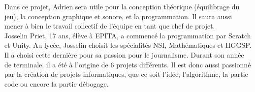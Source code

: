 \documentclass[12pt,a4paper]{article}
\begin{document}
\noindent Dans ce projet, Adrien sera utile pour la conception théorique (équilibrage du jeu), la conception graphique et sonore, et la programmation. Il saura aussi mener à bien le travail collectif de l'équipe en tant que chef de projet.\\

Josselin Priet, 17 ans, élève à EPITA, a commencé la programmation par Scratch et Unity. Au lycée, Josselin choisit les spécialités NSI, Mathématiques et HGGSP. Il a choisi cette dernière pour sa passion pour le journalisme. Durant son année de terminale, il a été à l’origine de 6 projets différents. Il est donc aussi passionné par la création de projets informatiques, que ce soit l’idée, l’algorithme, la partie code ou encore la partie débogage.
\end{document}
